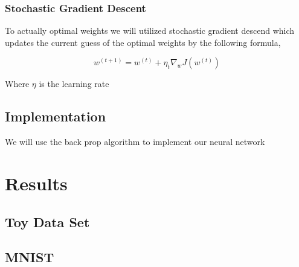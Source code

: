 \documentclass[12pt, twocolumn]{article}
\begin{document}
\subsubsection{Stochastic Gradient Descent}
To actually  optimal weights we will utilized stochastic gradient descend which updates the current guess of the optimal weights by the following formula,

\begin{equation}
w^{(t+1)} = w^{(t)} + \eta_t \nabla_w J(w^{(t)})
\end{equation}

Where $\eta$ is the learning rate
\subsection{Implementation}
We will use the back prop algorithm to implement our neural network 

\section{Results}
\subsection{ Toy Data Set}
\subsection{MNIST}


 
\end{document}
